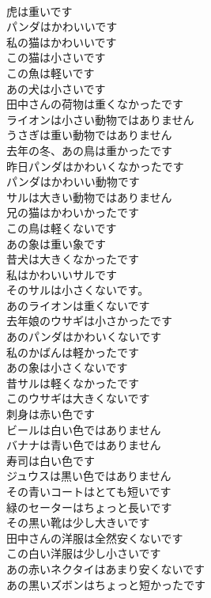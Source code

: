 \documentclass[8pt]{extreport}
\begin{document}
\begin{CJK}{UTF8}{min}
\\	虎は重いです	
\\	パンダはかわいいです	
\\	私の猫はかわいいです	
\\	この猫は小さいです	
\\	この魚は軽いです	
\\	あの犬は小さいです	
\\	田中さんの荷物は重くなかったです	
\\	ライオンは小さい動物ではありません	
\\	うさぎは重い動物ではありません	
\\	去年の冬、あの鳥は重かったです	
\\	昨日パンダはかわいくなかったです	
\\	パンダはかわいい動物です	
\\	サルは大きい動物ではありません	
\\	兄の猫はかわいかったです	
\\	この鳥は軽くないです	
\\	あの象は重い象です	
\\	昔犬は大きくなかったです	
\\	私はかわいいサルです	
\\	そのサルは小さくないです。	
\\	あのライオンは重くないです	
\\	去年娘のウサギは小さかったです	
\\	あのパンダはかわいくないです	
\\	私のかばんは軽かったです	
\\	あの象は小さくないです	
\\	昔サルは軽くなかったです	
\\	このウサギは大きくないです	
\\	刺身は赤い色です	
\\	ビールは白い色ではありません	
\\	バナナは青い色ではありません	
\\	寿司は白い色です	
\\	ジュウスは黒い色ではありません	
\\	その青いコートはとても短いです	
\\	緑のセーターはちょっと長いです	
\\	その黒い靴は少し大きいです	
\\	田中さんの洋服は全然安くないです	
\\	この白い洋服は少し小さいです	
\\	あの赤いネクタイはあまり安くないです	
\\	あの黒いズボンはちょっと短かったです	

\end{CJK}
\end{document}
